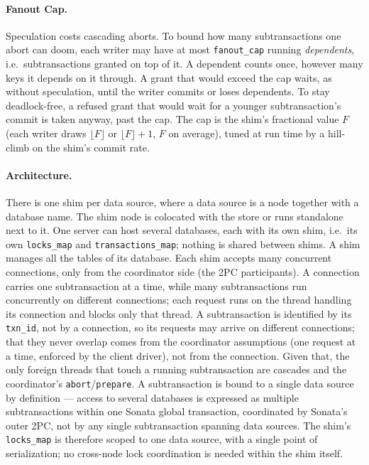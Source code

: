 \documentclass{article}
\begin{document}
\paragraph{Fanout Cap.}
Speculation costs cascading aborts. To bound how many subtransactions one abort can doom, each writer may have at most \texttt{fanout\_cap} running \emph{dependents}, i.e.\ subtransactions granted on top of it. A dependent counts once, however many keys it depends on it through. A grant that would exceed the cap waits, as without speculation, until the writer commits or loses dependents. To stay deadlock-free, a refused grant that would wait for a younger subtransaction's commit is taken anyway, past the cap. The cap is the shim's fractional value $F$ (each writer draws $\lfloor F \rfloor$ or $\lfloor F \rfloor + 1$, $F$ on average), tuned at run time by a hill-climb on the shim's commit rate.

\paragraph{Architecture.}
There is one shim per data source, where a data source is a node together with a database name. The shim node is colocated with the store or runs standalone next to it. One server can host several databases, each with its own shim, i.e.\ its own \texttt{locks\_map} and \texttt{transactions\_map}; nothing is shared between shims. A shim manages all the tables of its database. Each shim accepts many concurrent connections, only from the coordinator side (the 2PC participants). A connection carries one subtransaction at a time, while many subtransactions run concurrently on different connections; each request runs on the thread handling its connection and blocks only that thread. A subtransaction is identified by its \texttt{txn\_id}, not by a connection, so its requests may arrive on different connections; that they never overlap comes from the coordinator assumptions (one request at a time, enforced by the client driver), not from the connection. Given that, the only foreign threads that touch a running subtransaction are cascades and the coordinator's \texttt{abort}/\texttt{prepare}. A subtransaction is bound to a single data source by definition --- access to several databases is expressed as multiple subtransactions within one Sonata global transaction, coordinated by Sonata's outer 2PC, not by any single subtransaction spanning data sources. The shim's \texttt{locks\_map} is therefore scoped to one data source, with a single point of serialization; no cross-node lock coordination is needed within the shim itself.
\end{document}
